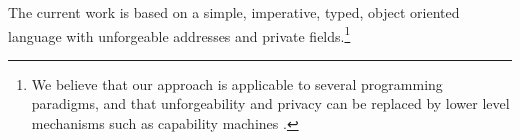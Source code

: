  
  The current work is based on a simple, imperative, typed, object oriented
language with unforgeable addresses and private fields.\footnote{We believe
 that our approach is applicable to several programming paradigms, and 
 that   unforgeability and privacy
 can be replaced 
 by lower level mechanisms such as capability machines \cite{vanproving,davis2019cheriabi}.
}


% 
% 
%
% 
% 



